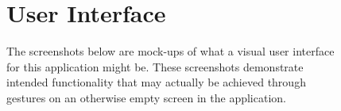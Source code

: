 \documentclass{scrreprt}
\begin{document}
\begin{figure}[ht!]
\section{User Interface}
The screenshots below are mock-ups of what a visual user interface for this application might be. These screenshots demonstrate intended functionality that may actually be achieved through gestures on an otherwise empty screen in the application.
     \begin{center}
%
\end{center}
\end{figure}
\end{document}
